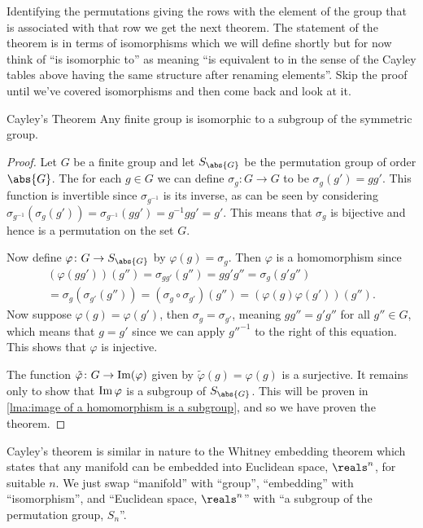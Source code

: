 Identifying the permutations giving the rows with the element of the group that is associated with that row we get the next theorem.
The statement of the theorem is in terms of isomorphisms which we will define shortly but for now think of \enquote{is isomorphic to} as meaning \enquote{is equivalent to in the sense of the Cayley tables above having the same structure after renaming elements}.
Skip the proof until we've covered isomorphisms and then come back and look at it.

\begin{thm}{Cayley's Theorem}{}
    Any finite group is isomorphic to a subgroup of the symmetric group.
    \begin{proof}
        Let \(G\) be a finite group and let \(S_{\abs{G}}\) be the permutation group of order \(\abs{G}\).
        The for each \(g \in G\) we can define \(\sigma_g \colon G \to G\) to be \(\sigma_g(g') = gg'\).
        This function is invertible since \(\sigma_{g^{-1}}\) is its inverse, as can be seen by considering \(\sigma_{g^{-1}}(\sigma_{g}(g')) = \sigma_{g^{-1}}(gg') = g^{-1}gg' = g'\).
        This means that \(\sigma_g\) is bijective and hence is a permutation on the set \(G\).
        
        Now define \(\varphi\colon G \to S_{\abs{G}}\) by \(\varphi(g) = \sigma_g\).
        Then \(\varphi\) is a homomorphism since
        \begin{multline}
            (\varphi(gg'))(g'') = \sigma_{gg'}(g'') = gg'g'' = \sigma_g(g'g'')\\
            = \sigma_{g}(\sigma_{g'}(g'')) = (\sigma_g \circ \sigma_{g'})(g'') = (\varphi(g)\varphi(g'))(g'').
        \end{multline}
        Now suppose \(\varphi(g) = \varphi(g')\), then \(\sigma_g = \sigma_{g'}\), meaning \(gg'' = g'g''\) for all \(g'' \in G\), which means that \(g = g'\) since we can apply \(g''^{-1}\) to the right of this equation.
        This shows that \(\varphi\) is injective.
        
        The function \(\tilde{\varphi} \colon G \to \operatorname{Im}(\varphi)\) given by \(\tilde{\varphi}(g) = \varphi(g)\) is a surjective.
        It remains only to show that \(\operatorname{Im}\varphi\) is a subgroup of \(S_{\abs{G}}\).
        This will be proven in \cref{lma:image of a homomorphism is a subgroup}, and so we have proven the theorem.
    \end{proof}
\end{thm}

Cayley's theorem is similar in nature to the Whitney embedding theorem which states that any manifold can be embedded into Euclidean space, \(\reals^n\), for suitable \(n\).
We just swap \enquote{manifold} with \enquote{group}, \enquote{embedding} with \enquote{isomorphism}, and \enquote{Euclidean space, \(\reals^n\)} with \enquote{a subgroup of the permutation group, \(S_n\)}.

